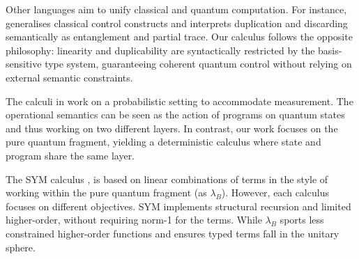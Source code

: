 \documentclass[a4paper,UKenglish,numberwithinsect,pdfa,anonymous]{lipics-v2021}
\theoremstyle{restatestyle}
\newcommand\cmark{\tikz\fill[scale=0.4](0,.35) -- (.25,0) -- (1,.7) -- (.25,.15) -- cycle;}
\newcommand{\lambdaB}{\lambda_B}
\begin{document}
Other languages aim to unify classical and quantum computation.
For instance,~\cite{VoichickLiRandHicks2023} generalises classical
control constructs and interprets duplication and discarding semantically as
entanglement and partial trace. Our calculus follows the opposite philosophy: 
linearity and duplicability are syntactically restricted by the basis-sensitive 
type system, guaranteeing coherent quantum control without relying on external 
semantic constraints.

The calculi in \cite{DaveLemonnierPechouxZamdzhiev_2025, BarssePechouxPerdrix_2026} work 
on a probabilistic setting to accommodate measurement. The operational semantics can be
seen as the action of programs on quantum states and thus working on two different layers.
In contrast, our work focuses on the pure quantum fragment, yielding a deterministic
calculus where state and program share the same layer.

The SYM calculus \cite{SabryValironVizzotto_2018}, is based on linear combinations of
terms in the style of \cite{ArrighiDowekLMCS17} working within the pure quantum fragment
(as $\lambdaB$). However, each calculus focuses on different objectives. SYM implements 
structural recursion and limited higher-order, without requiring norm-1 for the terms. While 
$\lambdaB$ sports less constrained higher-order functions and ensures typed terms fall in the 
unitary sphere.

\end{document}
